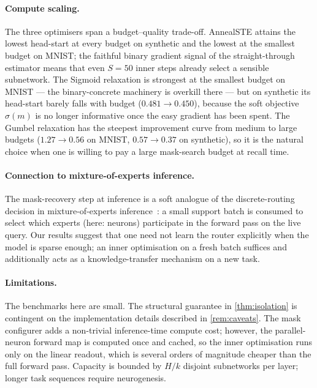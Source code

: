 \documentclass{article}
\theoremstyle{plain}
\theoremstyle{remark}
\begin{document}
\paragraph{Compute scaling.}
The three optimisers span a budget--quality trade-off. AnnealSTE
attains the lowest head-start at every budget on synthetic and the
lowest at the smallest budget on MNIST; the faithful binary gradient
signal of the straight-through estimator means that even $S{=}50$
inner steps already select a sensible subnetwork. The Sigmoid
relaxation is strongest at the smallest budget on MNIST --- the
binary-concrete machinery is overkill there --- but on synthetic its
head-start barely falls with budget ($0.481\!\to\!0.450$), because the
soft objective $\sigma(m)$ is no longer informative once the easy
gradient has been spent. The Gumbel relaxation has the steepest
improvement curve from medium to large budgets ($1.27\!\to\!0.56$ on
MNIST, $0.57\!\to\!0.37$ on synthetic), so it is the natural choice
when one is willing to pay a large mask-search budget at recall time.

\paragraph{Connection to mixture-of-experts inference.}
The mask-recovery step at inference is a soft analogue of the
discrete-routing decision in mixture-of-experts
inference~\citep{shazeer2017outrageously, fedus2022switch}: a small
support batch is consumed to select which experts (here: neurons)
participate in the forward pass on the live query. Our results suggest
that one need not learn the router explicitly when the model is sparse
enough; an inner optimisation on a fresh batch suffices and additionally
acts as a knowledge-transfer mechanism on a new task.

\paragraph{Limitations.}
The benchmarks here are small. The structural guarantee in
\cref{thm:isolation} is contingent on the implementation details
described in \cref{rem:caveats}. The mask configurer adds a non-trivial
inference-time compute cost; however, the parallel-neuron forward map
is computed once and cached, so the inner optimisation runs only on the
linear readout, which is several orders of magnitude cheaper than the
full forward pass. Capacity is bounded by $H/k$ disjoint subnetworks per
layer; longer task sequences require neurogenesis.
\end{document}
